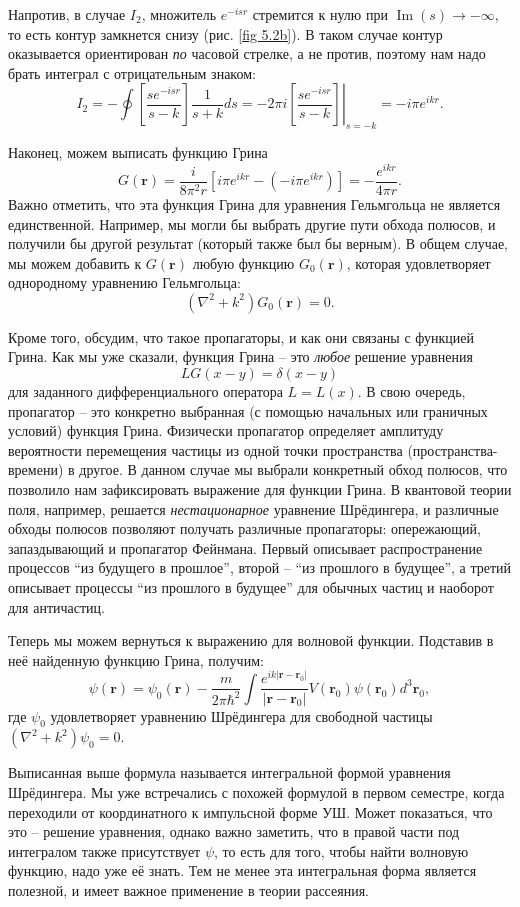 Напротив, в случае $I_2$, множитель $e^{-isr}$ стремится к нулю при
$\operatorname{Im}(s)\to-\infty$, то есть контур замкнется снизу (рис. \ref{fig
  5.2b}). В таком случае контур оказывается ориентирован \textit{по} часовой
стрелке, а не против, поэтому нам надо брать интеграл с отрицательным знаком:
\[
  I_2=-\oint\left[\frac{se^{-isr}}{s-k}\right]\frac{1}{s+k}ds=-2\pi i\left.\left[\frac{se^{-isr}}{s-k}\right]\right|_{s=-k}=-i\pi e^{ikr}.
\]

Наконец, можем выписать функцию Грина
\[
  G(\textbf{r})=\frac{i}{8\pi^2 r}\left[i\pi e^{ikr}-(-i\pi e^{ikr})\right]=-\frac{e^{ikr}}{4\pi r}.
\]
Важно отметить, что эта функция Грина для уравнения Гельмгольца не является
единственной. Например, мы могли бы выбрать другие пути обхода полюсов, и
получили бы другой результат (который также был бы верным). В общем случае, мы
можем добавить к $G(\textbf{r})$ любую функцию $G_0(\textbf{r})$, которая
удовлетворяет однородному уравнению Гельмгольца:
\[
  (\nabla^2+k^2)G_0(\textbf{r})=0.
\]

Кроме того, обсудим, что такое пропагаторы, и как они связаны с функцией Грина.
Как мы уже сказали, функция Грина -- это \textit{любое} решение уравнения
\[
  LG(x-y)=\delta(x-y)
\]
для заданного дифференциального оператора $L = L(x)$. В свою очередь,
пропагатор -- это конкретно выбранная (с помощью начальных или граничных
условий) функция Грина. Физически пропагатор определяет амплитуду вероятности
перемещения частицы из одной точки пространства (пространства-времени) в
другое. В данном случае мы выбрали конкретный обход полюсов, что позволило нам
зафиксировать выражение для функции Грина. В квантовой теории поля, например,
решается \textit{нестационарное} уравнение Шрёдингера, и различные обходы
полюсов позволяют получать различные пропагаторы: опережающий, запаздывающий и
пропагатор Фейнмана. Первый описывает распространение процессов ``из будущего в
прошлое'', второй -- ``из прошлого в будущее'', а третий описывает процессы
``из прошлого в будущее'' для обычных частиц и наоборот для античастиц.

Теперь мы можем вернуться к выражению для волновой функции. Подставив в неё
найденную функцию Грина, получим:
\[
  \psi(\textbf{r})=\psi_0(\textbf{r})-\frac{m}{2\pi\hbar^2}\int\frac{e^{ik|\textbf{r}-\textbf{r}_0|}}{|\textbf{r}-\textbf{r}_0|}V(\textbf{r}_0)\psi(\textbf{r}_0)d^3\textbf{r}_0,
\]
где $\psi_0$ удовлетворяет уравнению Шрёдингера для свободной частицы
$(\nabla^2+k^2)\psi_0=0$.

Выписанная выше формула называется интегральной формой уравнения Шрёдингера. Мы
уже встречались с похожей формулой в первом семестре, когда переходили от
координатного к импульсной форме УШ. Может показаться, что это -- решение
уравнения, однако важно заметить, что в правой части под интегралом также
присутствует $\psi$, то есть для того, чтобы найти волновую функцию, надо уже
её знать. Тем не менее эта интегральная форма является полезной, и имеет важное
применение в теории рассеяния.

